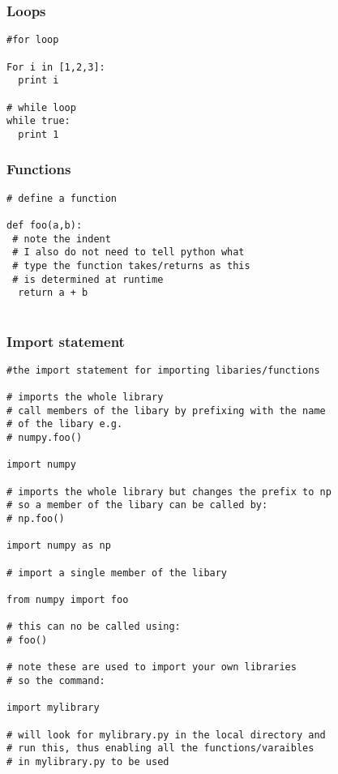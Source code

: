 \documentclass[11pt,a4paper]{article}
\begin{document}
\subsubsection{Loops}
\begin{verbatim}
#for loop

For i in [1,2,3]:
  print i 

# while loop
while true:
  print 1
\end{verbatim}

\subsubsection{Functions}
\begin{verbatim}
# define a function

def foo(a,b):
 # note the indent
 # I also do not need to tell python what
 # type the function takes/returns as this
 # is determined at runtime
  return a + b 
  
\end{verbatim}

\subsubsection{Import statement}
\begin{verbatim}
#the import statement for importing libaries/functions

# imports the whole library
# call members of the libary by prefixing with the name
# of the libary e.g.
# numpy.foo()

import numpy

# imports the whole library but changes the prefix to np
# so a member of the libary can be called by:
# np.foo()
 
import numpy as np

# import a single member of the libary

from numpy import foo

# this can no be called using:
# foo()

# note these are used to import your own libraries
# so the command:

import mylibrary

# will look for mylibrary.py in the local directory and 
# run this, thus enabling all the functions/varaibles
# in mylibrary.py to be used

\end{verbatim}
\end{document}
